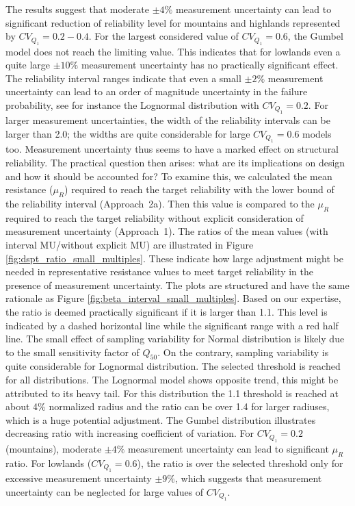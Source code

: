 The results suggest that moderate $\pm 4\%$ measurement uncertainty can lead to significant reduction of reliability level for mountains and highlands represented by $CV_{Q_1} = 0.2-0.4$. For the largest considered value of $CV_{Q_1} = 0.6$, the Gumbel model does not reach the limiting value. This indicates that for lowlands even a quite large $\pm 10\%$ measurement uncertainty has no practically significant effect. The reliability interval ranges indicate that even a small $\pm 2\%$ measurement uncertainty can lead to an order of magnitude uncertainty in the failure probability, see for instance the Lognormal distribution with $CV_{Q_1} = 0.2$. For larger measurement uncertainties, the width of the reliability intervals can be larger than 2.0; the widths are quite considerable for large $CV_{Q_1} = 0.6$ models too.
Measurement uncertainty thus seems to have a marked effect on structural reliability. The practical question then arises: what are its implications on design and how it should be accounted for? To examine this, we calculated the mean resistance ($\mu_R$) required to reach the target reliability with the lower bound of the reliability interval (Approach~2a). Then this value is compared to the $\mu_R$ required to reach the target reliability without explicit consideration of measurement uncertainty (Approach~1). The ratios of the mean values (with interval MU/without explicit MU) are illustrated in Figure \ref{fig:dspt_ratio_small_multiples}. These indicate how large adjustment might be needed in representative resistance values to meet target reliability in the presence of measurement uncertainty. The plots are structured and have the same rationale as Figure \ref{fig:beta_interval_small_multiples}. Based on our expertise, the ratio is deemed practically significant if it is larger than 1.1. This level is indicated by a dashed horizontal line while the significant range with a red half line. The small effect of sampling variability for Normal distribution is likely due to the small sensitivity factor of $Q_{50}$. On the contrary, sampling variability is quite considerable for Lognormal distribution. The selected threshold is reached for all distributions. The Lognormal model shows opposite trend, this might be attributed to its heavy tail. For this distribution the 1.1 threshold is reached at about 4\% normalized radius and the ratio can be over 1.4 for larger radiuses, which is a huge potential adjustment. The Gumbel distribution illustrates decreasing ratio with increasing coefficient of variation. For $CV_{Q_1} = 0.2$ (mountains), moderate $\pm 4\%$ measurement uncertainty can lead to significant $\mu_R$ ratio. For lowlands ($CV_{Q_1} = 0.6$), the ratio is over the selected threshold only for excessive measurement uncertainty $\pm 9\%$, which suggests that measurement uncertainty can be neglected for large values of $CV_{Q_1}$.
